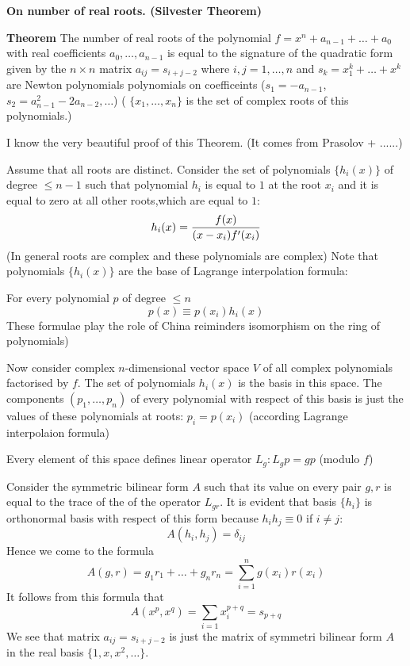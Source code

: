 

   \centerline {\bf On  number of real roots. (Silvester Theorem)}


   \bigskip

    {\bf Theorem}   The number of real roots of the polynomial
    $f=x^n+a_{n-1}+\dots+a_0$ with real coefficients $a_0,\dots,a_{n-1}$
    is equal to the signature
    of the quadratic form given by the $n\times n$ matrix
    $a_{ij}=s_{i+j-2}$ where $i,j=1,\dots,n$ and
    $s_k=x_1^k+\dots+x^k$ are Newton polynomials
    polynomials on coefficeints ($s_1=-a_{n-1}$, $s_2=a_{n-1}^2-2a_{n-2},\dots$)
        (  $\{x_1,\dots,x_n\}$ is the  set of complex roots of this polynomials.)

  I know the very beautiful proof of this Theorem.
  (It comes from Prasolov + ......)


   Assume that all roots are distinct.
   Consider the set of polynomials
   $\{h_i(x)\}$ of degree $\leq n-1$ such that polynomial
   $h_{i}$ is equal to $1$ at the root  $x_i$ and it is equal to zero
   at all other roots,which are equal to $1$:
                          $$
              h_i(x)={f(x)\over (x-x_i)f'(x_i)}
                        $$
                        (In general roots are complex and these polynomials are complex)
Note that polynomials $\{h_i(x)\}$ are the base of Lagrange interpolation formula:

For every polynomial $p$ of degree $\leq n$
                             $$
            p(x)\equiv p(x_i)h_i(x)
                             $$
   These formulae play the role of China reiminders isomorphism
   on the ring of polynomials)


Now consider complex $n$-dimensional vector space $V$ of all complex polynomials
factorised by $f$.  The set of polynomials ${h_i(x)}$ is the basis in this space. The
components $(p_1,\dots,p_n)$ of every polynomial with respect of this basis is just the
values of these polynomials at roots: $p_i=p(x_i)$ (according Lagrange interpolaion
formula)

Every element of this space defines linear operator $L_g: L_gp=gp$ (modulo $f$)

Consider the symmetric bilinear form   $A$
 such that its value on every pair $g,r$ is equal to the trace of the
 of the operator $L_{gr}$. It is evident that basis $\{h_i\}$
 is orthonormal basis with respect of this form because $h_ih_j\equiv 0$ if $i\not=j$:
                        $$
                        A(h_i,h_j)=\delta_{ij}
                 $$
 Hence  we come to the formula
                   $$
       A(g,r)=g_1r_1+\dots+g_nr_n=\sum_{i=1}^ng(x_i)r(x_i)
                            $$
It follows from this formula that
                  $$
              A(x^p,x^q)=\sum_{i=1}x_i^{p+q}=s_{p+q}
                     $$
We see that matrix  $a_{ij}=s_{i+j-2}$ is just the matrix of symmetri bilinear form $A$
in the real basis $\{1,x,x^2,\dots\}$.

